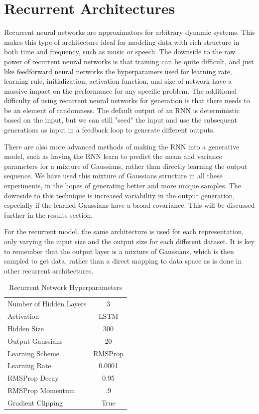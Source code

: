\documentclass{article} %
\begin{document}
\section{Recurrent Architectures}
Recurrent neural networks are approximators for arbitrary dynamic systems.
This makes this type of architecture ideal for modeling data with rich
structure in both time and frequency, such as music or speech. The downside
to the raw power of recurrent neural networks is that training can be quite
difficult, and just like feedforward neural networks the hyperparamers
used for learning rate, learning rule, initialization, activation function, and
size of network have a massive impact on the performance for any specific
problem. The additional difficulty of using recurrent neural networks for
generation is that there needs to be an element of randomness. The default output of an RNN 
is deterministic based on the input, but we can still "seed" the
input and use the subsequent generations as input in a feedback loop to
generate different outputs.
\par
There are also more advanced methods of making the
RNN into a generative model, such as having the RNN learn
to predict the mean and variance parameters for a mixture of Gaussians,
rather than directly learning the output sequence. We have used this mixture of
Gaussians structure in all these experiments, in the
hopes of generating better and more unique samples. The downside to this
technique is increased variability in the output generation, especially if
the learned Gaussians have a broad covariance. This
will be discussed further in the results section.
\par
For the recurrent model, the same architecture is used for each
representation, only varying the input size and the output size for each
different dataset. It is key to remember that the output layer is a mixture of
Gaussians, which is then sampled to get data, rather than a direct mapping to
data space as is done in other recurrent architectures.
\begin{table}[ht]
\caption{Recurrent Network Hyperparameters} %
\centering %
\begin{tabular}{p{4cm} c} %
\hline\hline %
Number of Hidden Layers & 3 \\%
Activation & LSTM \\
Hidden Size & 300 \\
Output Gaussians & 20 \\
Learning Scheme & RMSProp \\
Learning Rate & 0.0001 \\
RMSProp Decay & 0.95 \\
RMSProp Momentum & .9 \\ 
Gradient Clipping & True \\
\hline %
\end{tabular}
\label{table:hyperparams} %
\end{table}
\end{document}
